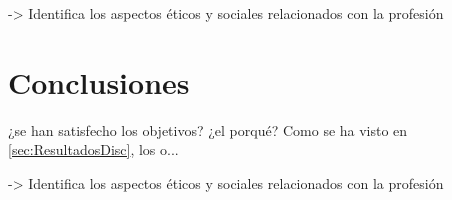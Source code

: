\documentclass{article}
\begin{document}
-> Identifica los aspectos éticos y sociales relacionados con la profesión


\section{Conclusiones}\label{sec:Conclusiones}

 ¿se han satisfecho los objetivos? ¿el porqué? Como se ha visto en \ref{sec:ResultadosDisc}, los o...

-> Identifica los aspectos éticos y sociales relacionados con la profesión




\end{document}
